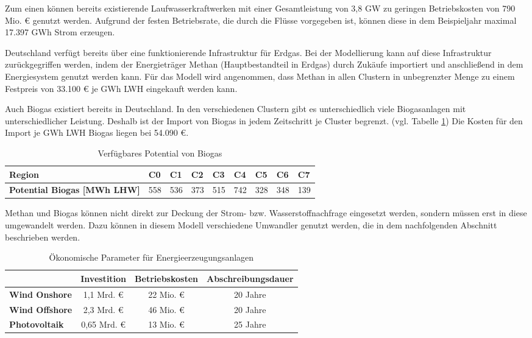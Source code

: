 Zum einen können bereits existierende Laufwasserkraftwerken mit einer Gesamtleistung von 3,8 GW zu geringen Betriebskosten von 790 Mio. € genutzt werden. Aufgrund der festen Betriebsrate, die durch die Flüsse vorgegeben ist, können diese in dem Beispieljahr maximal 17.397 GWh Strom erzeugen.

Deutschland verfügt bereits über eine funktionierende Infrastruktur für Erdgas. Bei der Modellierung kann auf diese Infrastruktur zurückgegriffen werden, indem der Energieträger Methan (Hauptbestandteil in Erdgas) durch Zukäufe importiert und anschließend in dem Energiesystem genutzt werden kann. Für das Modell wird angenommen, dass Methan in allen Clustern in unbegrenzter Menge zu einem Festpreis von 33.100 € je GWh LWH eingekauft werden kann.

Auch Biogas existiert bereits in Deutschland. In den verschiedenen Clustern gibt es unterschiedlich viele Biogasanlagen mit unterschiedlicher Leistung. Deshalb ist der Import von Biogas in jedem Zeitschritt je Cluster begrenzt. (vgl. Tabelle \ref{tab:biogasgas}) Die Kosten für den Import je GWh LWH Biogas liegen bei 54.090 €. 

\begin{table}[!ht]
    \centering
    \begin{tabular}{|l|l|l|l|l|l|l|l|l|}
    \hline
    \textbf{Region}                     & C0  & C1  & C2  & C3  & C4  & C5  & C6  & C7  \\ \hline
    \textbf{Potential Biogas [MWh LHW]} & 558 & 536 & 373 & 515 & 742 & 328 & 348 & 139 \\ \hline
    \end{tabular}
    \caption{Verfügbares Potential von Biogas}
    \label{tab:biogasgas}
\end{table}

Methan und Biogas können nicht direkt zur Deckung der Strom- bzw. Wasserstoffnachfrage eingesetzt werden, sondern müssen erst in diese umgewandelt werden. Dazu können in diesem Modell verschiedene Umwandler genutzt werden, die in dem nachfolgenden Abschnitt beschrieben werden.

\begin{table}[ht!]
    \centering
    \begin{tabular}{|l|c|c|c|}
        \hline
                                & \textbf{Investition} & \textbf{Betriebskosten} & \textbf{Abschreibungsdauer} \\ \hline
        \textbf{Wind Onshore}  & 1,1 Mrd. €                                     & 22 Mio. €                                  & 20 Jahre                    \\ \hline
        \textbf{Wind Offshore} & 2,3 Mrd. €                                     & 46 Mio. €                                  & 20 Jahre                    \\ \hline
        \textbf{Photovoltaik}  & 0,65 Mrd. €                                    & 13 Mio. €                                  & 25 Jahre                    \\ \hline
    \end{tabular}
    \caption{Ökonomische Parameter für Energieerzeugungsanlagen}
    \label{tab:param-energie}
\end{table}

